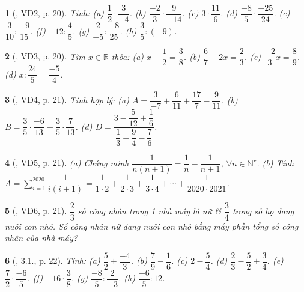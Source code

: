 \documentclass{article}
\newtheorem{baitoan}{}
\begin{document}
\begin{baitoan}[\cite{Binh_boi_duong_Toan_6_tap_2}, VD2, p. 20]
	Tính: (a) $\dfrac{1}{2}\cdot\dfrac{3}{-4}$. (b) $\dfrac{-2}{3}\cdot\dfrac{9}{-14}$. (c) $3\cdot\dfrac{11}{6}$. (d) $\dfrac{-8}{5}\cdot\dfrac{-25}{24}$. (e) $\dfrac{3}{10}:\dfrac{-9}{15}$. (f) $-12:\dfrac{4}{5}$. (g) $\dfrac{2}{-5}:\dfrac{-8}{25}$. (h) $\dfrac{3}{5}:(-9)$.
\end{baitoan}

\begin{baitoan}[\cite{Binh_boi_duong_Toan_6_tap_2}, VD3, p. 20]
	Tìm $x\in\mathbb{R}$ thỏa: (a) $x - \dfrac{1}{2} = \dfrac{3}{8}$. (b) $\dfrac{6}{7} - 2x = \dfrac{2}{3}$. (c) $\dfrac{-2}{3}x = \dfrac{8}{9}$. (d) $x:\dfrac{24}{5} = \dfrac{-5}{4}$.
\end{baitoan}

\begin{baitoan}[\cite{Binh_boi_duong_Toan_6_tap_2}, VD4, p. 21]
	Tính hợp lý: (a) $A = \dfrac{3}{-7} + \dfrac{6}{11} + \dfrac{17}{7} - \dfrac{9}{11}$. (b) $B = \dfrac{3}{5}\cdot\dfrac{-6}{13} - \dfrac{3}{5}\cdot\dfrac{7}{13}$. (d) $D = \dfrac{3 - \dfrac{5}{12} + \dfrac{1}{6}}{\dfrac{1}{3} + \dfrac{9}{4} - \dfrac{7}{6}}$.
\end{baitoan}

\begin{baitoan}[\cite{Binh_boi_duong_Toan_6_tap_2}, VD5, p. 21]
	(a) Chứng minh $\dfrac{1}{n(n + 1)} = \dfrac{1}{n} - \dfrac{1}{n + 1}$, $\forall n\in\mathbb{N}^\star$. (b) Tính $A = \sum_{i=1}^{2020} \dfrac{1}{i(i + 1)} = \dfrac{1}{1\cdot2} + \dfrac{1}{2\cdot3} + \dfrac{1}{3\cdot4} + \cdots + \dfrac{1}{2020\cdot2021}$.
\end{baitoan}

\begin{baitoan}[\cite{Binh_boi_duong_Toan_6_tap_2}, VD6, p. 21]
	$\dfrac{2}{3}$ số công nhân trong 1 nhà máy là nữ \& $\dfrac{3}{4}$ trong số họ đang nuôi con nhỏ. Số công nhân nữ đang nuôi con nhỏ bằng mấy phần tổng số công nhân của nhà máy?
\end{baitoan}

\begin{baitoan}[\cite{Binh_boi_duong_Toan_6_tap_2}, 3.1., p. 22]
	Tính: (a) $\dfrac{5}{2} + \dfrac{-4}{3}$. (b) $\dfrac{7}{9} - \dfrac{1}{6}$. (c) $2 - \dfrac{5}{4}$. (d) $\dfrac{2}{3} - \dfrac{5}{2} + \dfrac{3}{4}$. (e) $\dfrac{7}{2}\cdot\dfrac{-6}{5}$. (f) $-16\cdot\dfrac{3}{8}$. (g) $\dfrac{-8}{5}:\dfrac{2}{-3}$. (h) $\dfrac{-6}{5}:12$.
\end{baitoan}
\end{document}
